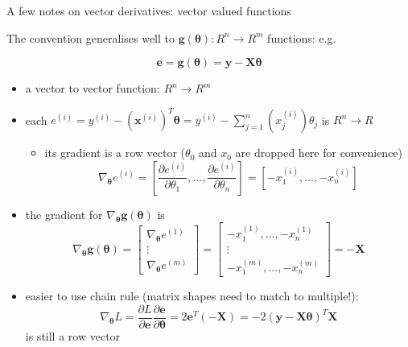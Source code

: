\documentclass[ignorenonframetext,]{beamer}
\providecommand{\tightlist}{%
  \setlength{\itemsep}{0pt}\setlength{\parskip}{0pt}}
\newcommand{\vv}[1]{\boldsymbol{#1}}
\begin{document}
\begin{frame}{A few notes on vector derivatives: vector valued
functions}
\protect\hypertarget{a-few-notes-on-vector-derivatives-vector-valued-functions}{}

The convention generalises well to
\(\vv{g}(\vv{\theta}): R^n\rightarrow R^m\) functions: e.g.

\[\vv{e} = \vv{g}(\vv{\theta}) =\vv{y} - \vv{X}\vv{\theta}\]

\begin{itemize}
\tightlist
\item
  a vector to vector function: \(R^n\rightarrow R^m\)
\item
  each
  \(e^{(i)} = y^{(i)}- (\vv{x}^{(i)})^T \vv{\theta} = y^{(i)}- \sum_{j=1}^n ({x}^{(i)}_j) {\theta_j}\)
  is \(R^n \rightarrow R\)

  \begin{itemize}
  \tightlist
  \item
    its gradient is a row vector (\(\theta_0\) and \(x_0\) are dropped
    here for convenience)
    \[\nabla_{\vv{\theta}} e^{(i)} = \left [\frac{\partial e^{(i)}}{\partial\theta_1}, \ldots, \frac{\partial e^{(i)}}{\partial\theta_n}\right ] = \left [-x_1^{(i)}, \ldots, -x_n^{(i)} \right]\]
  \end{itemize}
\item
  the gradient for \(\nabla_{\vv{\theta}} \vv{g}(\vv{\theta})\) is
  \[\nabla_{\vv{\theta}} \vv{g}(\vv{\theta})  = \begin{bmatrix} \nabla_{\vv{\theta}} e^{(1)} \\ \vdots \\ \nabla_{\vv{\theta}} e^{(m)} \end{bmatrix}  = \begin{bmatrix} -x_1^{(1)}, \ldots, -x_n^{(1)}  \\ \vdots \\ -x^{(m)}_1, \ldots, -x^{(m)}_n  \end{bmatrix}= -\vv{X}\]
\end{itemize}

\end{frame}

\begin{frame}{}
\protect\hypertarget{section}{}

\begin{itemize}
\tightlist
\item
  easier to use chain rule (matrix shapes need to match to multiple!):
  \[\nabla_{\vv{\theta}} L = \frac{\partial L}{\partial \vv{e}}\frac{\partial \vv{e}}{\partial \vv{\theta}} = 2\vv{e}^{T}(-\vv{X}) = -2(\vv{y}-\vv{X\theta})^{T}\vv{X} \]
  is still a row vector
\end{itemize}

\end{frame}
\end{document}
